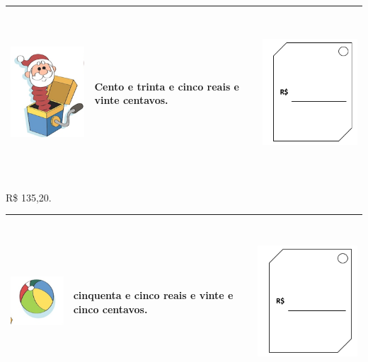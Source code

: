 \begin{longtable}[]{@{}lll@{}}
\toprule
\includegraphics[width=1.70857in,height=2.10446in]{media/image55.png} &
Cento e trinta e cinco reais e vinte centavos. &
\includegraphics[width=2.19822in,height=2.44826in]{media/image56.png}\tabularnewline
\bottomrule
\end{longtable}

R\$ 135,20.

\begin{longtable}[]{@{}lll@{}}
\toprule
\includegraphics[width=1.16683in,height=1.08348in]{media/image57.png} &
cinquenta e cinco reais e vinte e cinco centavos. &
\includegraphics[width=2.19822in,height=2.44826in]{media/image56.png}\tabularnewline
\bottomrule
\end{longtable}

